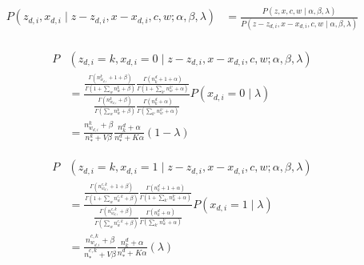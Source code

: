\documentclass[12pt]{article}
\begin{document}
\begin{align}
P (z_{d,i}, x_{d,i} \mid z-z_{d,i},x-x_{d,i},c,w;\alpha, \beta, \lambda) &= \frac{P (z, x, c, w\mid \alpha, \beta, \lambda)}{P (z-z_{d,i}, x-x_{d,i}, c, w\mid \alpha, \beta, \lambda)} \nonumber\\
\end{align}

\begin{align}
P &(z_{d,i}=k, x_{d,i} = 0 \mid z-z_{d,i},x-x_{d,i},c,w;\alpha, \beta, \lambda)  \nonumber\\
&=\frac{\frac{\Gamma(n^{k}_{w_{d,i}} +1+\beta)}{\Gamma(1+\sum_{w} n^{k}_{w}+\beta)}  \frac{\Gamma(n^{d}_{k} +1+\alpha)}{\Gamma(1+\sum_{k'} n^{k'}_{w}+\alpha)}}{\frac{\Gamma(n^{k}_{w_{d,i}} +\beta)}{\Gamma(\sum_{w} n^{k}_{w}+\beta)}  \frac{\Gamma(n^{d}_{k} +\alpha)}{\Gamma(\sum_{k'} n^{k'}_{w}+\alpha)}} P(x_{d,i} = 0 \mid \lambda)\nonumber\\
&= \frac{n^{k}_{w_{d,i}}+\beta}{n^{k}_{*}+V\beta}  \frac{n^{d}_{k} +\alpha}{n^{d}_{*} +K\alpha} (1-\lambda) 
\end{align}

\begin{align}
P &(z_{d,i}=k, x_{d,i} = 1 \mid z-z_{d,i},x-x_{d,i},c,w;\alpha, \beta, \lambda)  \nonumber\\
&=\frac{\frac{\Gamma(n^{c,k}_{w_{d,i}} +1+\beta)}{\Gamma(1+\sum_{w} n^{c,k}_{w}+\beta)}  \frac{\Gamma(n^{d}_{k} +1+\alpha)}{\Gamma(1+\sum_{k'} n^{k'}_{w}+\alpha)}}{\frac{\Gamma(n^{c,k}_{w_{d,i}} +\beta)}{\Gamma(\sum_{w} n^{c,k}_{w}+\beta)}  \frac{\Gamma(n^{d}_{k} +\alpha)}{\Gamma(\sum_{k'} n^{k'}_{w}+\alpha)}} P(x_{d,i} = 1 \mid \lambda)\nonumber\\
&= \frac{n^{c,k}_{w_{d,i}}+\beta}{n^{c,k}_{*}+V\beta}  \frac{n^{d}_{k} +\alpha}{n^{d}_{*} +K\alpha} (\lambda) 
\end{align}


\end{document}
